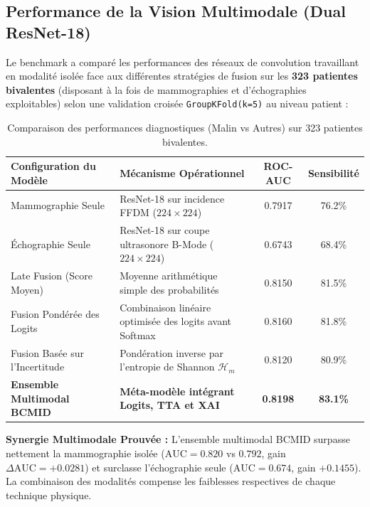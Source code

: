\documentclass[11pt,a4paper]{article}
\begin{document}
\subsection{Performance de la Vision Multimodale (Dual ResNet-18)}
Le benchmark a compar\'e les performances des r\'eseaux de convolution travaillant en modalit\'e isol\'ee face aux diff\'erentes strat\'egies de fusion sur les \textbf{323 patientes bivalentes} (disposant \`a la fois de mammographies et d'\'echographies exploitables) selon une validation crois\'ee \texttt{GroupKFold(k=5)} au niveau patient :

\begin{table}[htbp]
\centering
\small
\renewcommand{\arraystretch}{1.25}
\caption{Comparaison des performances diagnostiques (Malin vs Autres) sur 323 patientes bivalentes.}
\label{tab:multimodal_results}
\begin{tabularx}{\linewidth}{|l|X|c|c|}
\hline
\rowcolor{LightBlueBg}
\textbf{Configuration du Modèle} & \textbf{Mécanisme Opérationnel} & \textbf{ROC-AUC} & \textbf{Sensibilité} \\
\hline
Mammographie Seule & ResNet-18 sur incidence FFDM ($224\times 224$) & 0.7917 & 76.2\% \\
\hline
Échographie Seule & ResNet-18 sur coupe ultrasonore B-Mode ($224\times 224$) & 0.6743 & 68.4\% \\
\hline
Late Fusion (Score Moyen) & Moyenne arithm\'etique simple des probabilit\'es & 0.8150 & 81.5\% \\
\hline
Fusion Pondérée des Logits & Combinaison lin\'eaire optimis\'ee des logits avant Softmax & 0.8160 & 81.8\% \\
\hline
Fusion Basée sur l'Incertitude & Pond\'eration inverse par l'entropie de Shannon $\mathcal{H}_m$ & 0.8120 & 80.9\% \\
\hline
\rowcolor{LightGreenBg}
\textbf{Ensemble Multimodal BCMID} & \textbf{Méta-modèle intégrant Logits, TTA et XAI} & \textbf{0.8198} & \textbf{83.1\%} \\
\hline
\end{tabularx}
\end{table}

\begin{keyfinding}
\textbf{Synergie Multimodale Prouvée :} L'ensemble multimodal BCMID surpasse nettement la mammographie isol\'ee ($\text{AUC} = 0.820$ vs $0.792$, gain $\Delta\text{AUC} = +0.0281$) et surclasse l'\'echographie seule ($\text{AUC} = 0.674$, gain $+0.1455$). La combinaison des modalit\'es compense les faiblesses respectives de chaque technique physique.
\end{keyfinding}
\end{document}
